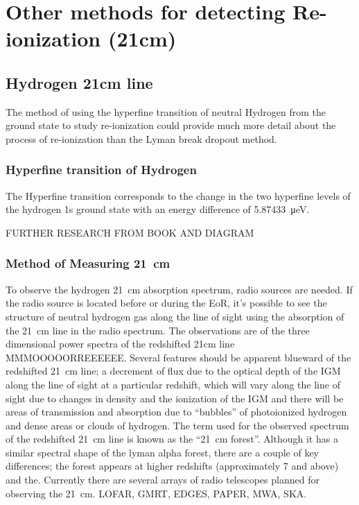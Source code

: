 
\section{Other methods for detecting Re-ionization (21cm)} %
\label{sec:other_methods_for_detecting_re-ionization}

    \subsection{Hydrogen 21cm line} %
    \label{sub:Hydrogen_21cm}
        The method of using the hyperfine transition of neutral Hydrogen from the ground state to study re-ionization could provide much more detail about the process of re-ionization than the Lyman break dropout method.

         \subsubsection{Hyperfine transition of Hydrogen} %
         \label{subsub:Hyperfine_Hydrogen}
            The Hyperfine transition corresponds to the change in the two hyperfine levels of the hydrogen 1s ground state with an energy difference of \SI{5.87433}{\micro\electronvolt}.

            FURTHER RESEARCH FROM BOOK AND DIAGRAM

        \subsubsection{Method of Measuring \SI{21}{\centi\metre}} %
    	\label{subsub:Measuring_21cm}
            To observe the hydrogen \SI{21}{\centi\metre} absorption spectrum, radio sources are needed. If the radio source is located before or during the EoR, it's possible to see the structure of neutral hydrogen gas along the line of sight using the absorption of the \SI{21}{\centi\metre} line in the radio spectrum. The observations are of the three dimensional power spectra of the redshifted  21cm line\cite{Liu} MMMOOOOORREEEEEE. Several features should be apparent blueward of the redshifted \SI{21}{\centi\metre} line; a decrement of flux due to the optical depth of the IGM along the line of sight at a particular redshift, which will vary along the line of sight due to changes in density and the ionization of the IGM and there will be areas of transmission and absorption due to ``bubbles'' of photoionized hydrogen and dense areas or clouds of hydrogen. The term used for the observed spectrum of the redshifted \SI{21}{\centi\metre} line is known as the ``\SI{21}{\centi\metre} forest''. Although it has a similar spectral shape of the lyman alpha forest, there are a couple of key differences; the forest appears at higher redshifts (approximately 7 and above) and the. Currently there are several arrays of radio telescopes planned for observing the \SI{21}{\centi\metre}. LOFAR, GMRT, EDGES, PAPER, MWA, SKA.

